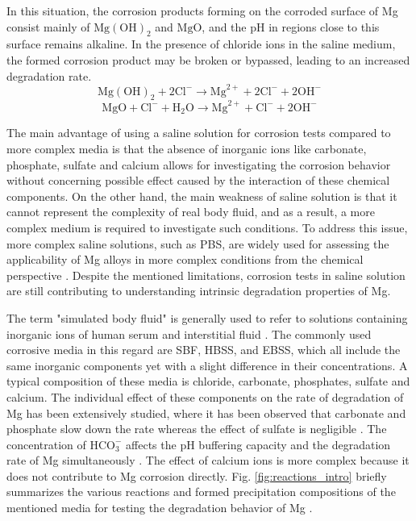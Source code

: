 In this situation, the corrosion products forming on the corroded surface of Mg consist mainly of $\mathrm{Mg}(\mathrm{OH})_{2}$ and $\mathrm{MgO}$, and the pH in regions close to this surface remains alkaline. In the presence of chloride ions in the saline medium, the formed corrosion product may be broken or bypassed, leading to an increased degradation rate.
\begin{equation} \label{eq:break_react_intro}
\mathrm{Mg}(\mathrm{OH})_{2}+2 \mathrm{Cl}^{-} \rightarrow \mathrm{Mg}^{2+}+2 \mathrm{Cl}^{-}+2 \mathrm{OH}^{-}
\end{equation}
\begin{equation} \label{eq:break_react_mgo_intro}
\mathrm{MgO}+ \mathrm{Cl}^{-} + \mathrm{H}_{2} \mathrm{O} \rightarrow \mathrm{Mg}^{2+}+ \mathrm{Cl}^{-}+ 2\mathrm{OH}^{-}
\end{equation}


The main advantage of using a saline solution for corrosion tests compared to more complex media is that the absence of inorganic ions like carbonate, phosphate, sulfate and calcium allows for investigating the corrosion behavior without concerning possible effect caused by the interaction of these chemical components. On the other hand, the main weakness of saline solution is that it cannot represent the complexity of real body fluid, and as a result, a more complex medium is required to investigate such conditions. To address this issue, more complex saline solutions, such as \gls{PBS}, are widely used for assessing the applicability of Mg alloys in more complex conditions from the chemical perspective \cite{Schille2011,Xue2012}. Despite the mentioned limitations, corrosion tests in saline solution are still contributing to understanding intrinsic degradation properties of Mg. 


The term "simulated body fluid" is generally used to refer to solutions containing inorganic ions of human serum and interstitial fluid \cite{Mei2020}. The commonly used corrosive media in this regard are \gls{SBF}, \gls{HBSS}, and \gls{EBSS}, which all include the same inorganic components yet with a slight difference in their concentrations. A typical composition of these media is chloride, carbonate, phosphates, sulfate and calcium. The individual effect of these components on the rate of degradation of Mg has been extensively studied, where it has been observed that carbonate and phosphate slow down the rate whereas the effect of sulfate is negligible \cite{Johnston2017,Mei2019a}. The concentration of $\mathrm{HCO}_{3}^{-}$ affects the pH buffering capacity and the degradation rate of Mg simultaneously \cite{Xin2011}. The effect of calcium ions is more complex because it does not contribute to Mg corrosion directly. Fig. \ref{fig:reactions_intro} briefly summarizes the various reactions and formed precipitation compositions of the mentioned media for testing the degradation behavior of Mg \cite{Mei2020}.


